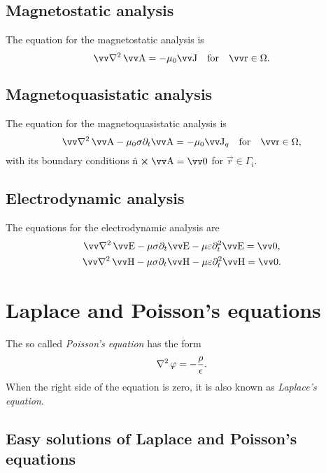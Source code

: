 \documentclass[margin=small]{tex/hsrzf}
\theoremstyle{elmagzf}
\begin{document}
\subsection{Magnetostatic analysis}
The equation for the magnetostatic analysis is
\begin{equation}
  \vlaplacian \vec{A} = -\mu_0 \vec{J} \quad\text{for}\quad \vec{r} \in \Omega.
\end{equation}

\subsection{Magnetoquasistatic analysis}
The equation for the magnetoquasistatic analysis is
\begin{equation}
  \vlaplacian \vec{A} - \mu_0 \sigma \partial_t \vec{A}
    = -\mu_0 \vec{J}_q \quad\text{for}\quad \vec{r} \in \Omega,
\end{equation}
with its boundary conditions \(\uvec{n}\crossp\vec{A} = \vec{0}\) for \(\vec{r}\in\Gamma_i\).

\subsection{Electrodynamic analysis}
The equations for the electrodynamic analysis are
\begin{subequations}
  \begin{gather}
    \vlaplacian \vec{E}
      - \mu \sigma \partial_t \vec{E}
      - \mu \varepsilon \partial^2_t \vec{E} = \vec{0},
      \label{eqn:wave-equation-e} \\
    \vlaplacian \vec{H}
      - \mu \sigma \partial_t \vec{H}
      - \mu \varepsilon \partial^2_t \vec{H} = \vec{0}.
      \label{eqn:wave-equation-h}
  \end{gather}
\end{subequations}

\section{Laplace and Poisson's equations} \label{sec:poisson}

The so called \emph{Poisson's equation} has the form
\[
  \operatorname{\nabla^2} \varphi = - \frac{\rho}{\epsilon}.
\]
When the right side of the equation is zero, it is also known as \emph{Laplace's
equation}.

\subsection{Easy solutions of Laplace and Poisson's equations}
\end{document}
